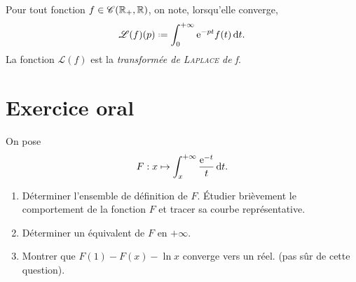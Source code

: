 \begin{defi}
    Pour tout fonction $f \in \mathscr{C}(\mathbb{R}_+, \mathbb{R})$, on note, lorsqu'elle converge, 
    $$\mathscr{L}(f)(p) \defeq \int_{0}^{+ \infty} \me^{-pt} f(t) \d t.$$
    La fonction $\mathscr{L}(f)$ est la \emph{transformée de \textsc{Laplace} de f}.
\end{defi}

\section{Exercice oral}
\begin{exercice}
    On pose
    $$F:x \mapsto \int_x^{+\infty} \frac{\mathrm{e}^{-t}}{t} \, \mathrm{d} t.$$
    \begin{enumerate}
        \item Déterminer l'ensemble de définition de $F$. Étudier brièvement le comportement de la fonction $F$ et tracer sa courbe représentative.
        \item Déterminer un  équivalent de $F$ en $+\infty$.
        \item Montrer que $F(1) - F(x) - \ln x$ converge vers un réel. (pas sûr de cette question).
    \end{enumerate}
\end{exercice}

